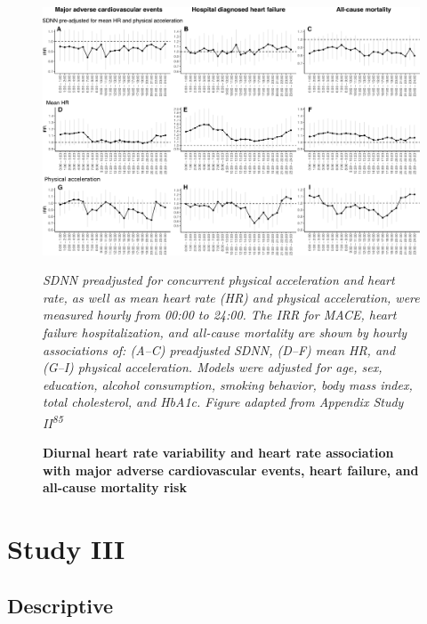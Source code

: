 \documentclass[
  letterpaper,
  headsepline=true,
  open=any]{scrbook}
\begin{document}

\begin{figure}

{\centering 

\includegraphics{images/figure_ADD_PRO_risk_by_hour.pdf}

\emph{SDNN preadjusted for concurrent physical acceleration and heart
rate, as well as mean heart rate (HR) and physical acceleration, were
measured hourly from 00:00 to 24:00. The IRR for MACE, heart failure
hospitalization, and all-cause mortality are shown by hourly
associations of: (A--C) preadjusted SDNN, (D--F) mean HR, and (G--I)
physical acceleration. Models were adjusted for age, sex, education,
alcohol consumption, smoking behavior, body mass index, total
cholesterol, and HbA1c. Figure adapted from Appendix Study
II\textsuperscript{85}}

}

\caption{\label{fig-ADD_PRO_risk_by_hour}\textbf{Diurnal heart rate
variability and heart rate association with major adverse cardiovascular
events, heart failure, and all-cause mortality risk}}

\end{figure}

\restoregeometry

\hypertarget{study-iii}{%
\section{Study III}\label{study-iii}}

\hypertarget{descriptive-2}{%
\subsection{Descriptive}\label{descriptive-2}}
\end{document}
